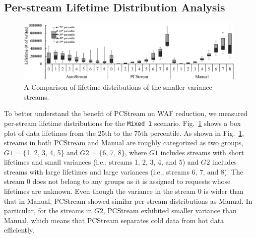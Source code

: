 \subsection{Per-stream Lifetime Distribution Analysis}

\begin{figure}[t]
	\centering
	\includegraphics[width=1\linewidth]{figure/distribution}
	\caption{A Comparison of lifetime distributions of the smaller variance streams.}
	\label{fig:distribution}
	\vspace{-20pt}
\end{figure}

To better understand the benefit of \textsf{\small PCStream} on WAF reduction,
we measured per-stream lifetime distributions for the \texttt{Mixed 1}
scenario.  Fig.~\ref{fig:distribution} shows a box plot of data lifetimes from
the 25th to the 75th percentile.  As shown in Fig.~\ref{fig:distribution},
streams in both \textsf{\small PCStream} and Manual are roughly categorized as
two groups, $G1$ = $\{$1, 2, 3, 4, 5$\}$ and $G2$ = $\{$6, 7, 8$\}$, where $G1$
includes streams with short lifetimes and small variances (i.e., streams 1, 2,
3, 4, and 5) and $G2$ includes streams with large lifetimes and large variances
(i.e., streams 6, 7, and 8). The stream 0 does not belong to any groups as it
is assigned to requests whose lifetimes are unknown.  Even though the variance
in the stream 0 is wider than that in Manual, PCStream showed similar
per-stream distributions as Manual. In particular, for the streams in $G2$,
PCStream exhibited smaller variance than Manual, which means that PCStream
separates cold data from hot data efficiently.

